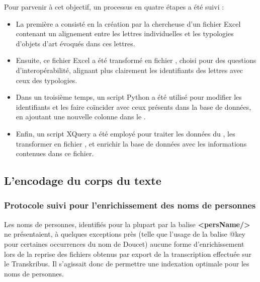 Pour parvenir à cet objectif, un processus en quatre étapes a été suivi : 
\begin{itemize}
    \item La première a consisté en la création par la chercheuse d'un fichier Excel contenant un alignement entre les lettres individuelles et les typologies d'objets d'art évoqués dans ces lettres.
    \item Ensuite, ce fichier Excel a été transformé en fichier \csv, choisi pour des questions d’interopérabilité, alignant plus clairement les identifiants des lettres avec ceux des typologies.
    \item Dans un troisième temps, un script Python a été utilisé pour modifier les identifiants et les faire coïncider avec ceux présents dans la base de données, en ajoutant une nouvelle colonne dans le \csv.
    \item Enfin, un script XQuery a été employé pour traiter les données du \csv, les transformer en fichier \xml, et enrichir la base de données \tei avec les informations contenues dans ce fichier.
\end{itemize}
   
\subsection{L’encodage du corps du texte}

\subsubsection{Protocole suivi pour l’enrichissement des noms de personnes}

Les noms de personnes, identifiés pour la plupart par la balise \textbf{<persName/>} ne présentaient, à quelques exceptions près (telle que l’usage de la balise @key pour certaines occurrences du nom de Doucet) aucune forme d’enrichissement lors de la reprise des fichiers obtenus par export \tei de la transcription effectuée sur le Transkribus. Il s’agissait donc de permettre une indexation optimale pour les noms de personnes.  

